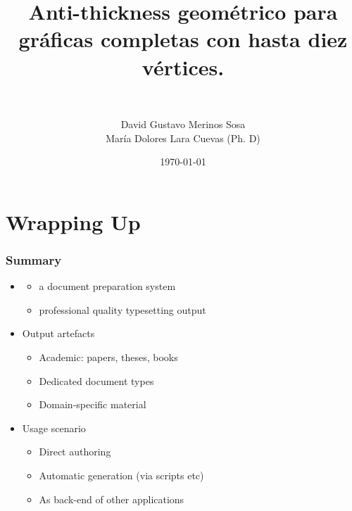 \documentclass[xcolor={x11names,svgnames,dvipsnames,table}]{beamer}
\author{David Gustavo Merinos Sosa \\ María Dolores Lara Cuevas (Ph. D)}
\title{Anti-thickness geométrico para gráficas completas con hasta diez vértices.}
\subtitle{\texorpdfstring{
\hrulefill\ \adforn{57}\thickspace\pgfornament[height=0.75em,ydelta=-0.25em]{1}\thickspace\adforn{29}\ \hrulefill}{ }}
\date{\today}
\begin{document}
\begin{frame}[plain]
\maketitle
\end{frame}




\section{Wrapping Up} 

\begin{frame}
\frametitle{Summary}
\begin{itemize}
\item<+-> 
	\begin {itemize}
	\item a document preparation system
	\item professional quality typesetting output
	\end{itemize}
\item<+-> Output artefacts
	\begin{itemize}
	\item Academic: papers, theses, books
	\item Dedicated document types
	\item Domain-specific material
	\end{itemize}
\item<+-> Usage scenario
	\begin{itemize}
	\item Direct authoring
	\item Automatic generation (via scripts etc)
	\item As back-end of other applications
	\end{itemize}
\end{itemize}
\end{frame}
\end{document}
